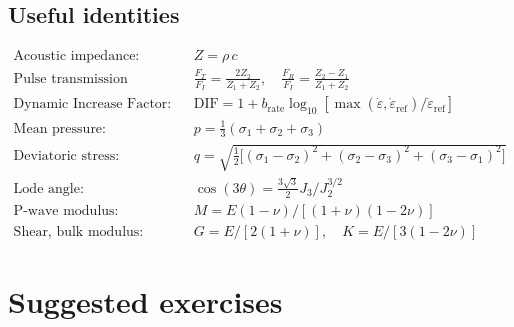 \documentclass[11pt,a4paper,openany]{book}
\theoremstyle{handbook}
\newcommand{\sig}{\sigma}
\newcommand{\eps}{\varepsilon}
\newcommand{\epsdot}{\dot\eps}
\begin{document}
\section{Useful identities}
\begin{align*}
  \text{Acoustic impedance:}\quad & Z=\rho\,c \\
  \text{Pulse transmission (Fresnel):}\quad
    & \frac{F_T}{F_I}=\frac{2Z_2}{Z_1+Z_2},
      \quad \frac{F_R}{F_I}=\frac{Z_2-Z_1}{Z_1+Z_2} \\
  \text{Dynamic Increase Factor:}\quad
    & \text{DIF}=1+b_{\text{rate}}\log_{10}
      \!\left[\max(\epsdot,\epsdot_{\text{ref}})/\epsdot_{\text{ref}}\right] \\
  \text{Mean pressure:}\quad & p=\tfrac{1}{3}(\sig_1+\sig_2+\sig_3) \\
  \text{Deviatoric stress:}\quad
    & q=\sqrt{\tfrac{1}{2}\bigl[(\sig_1-\sig_2)^{2}+(\sig_2-\sig_3)^{2}+(\sig_3-\sig_1)^{2}\bigr]} \\
  \text{Lode angle:}\quad
    & \cos(3\theta)=\tfrac{3\sqrt{3}}{2}J_3/J_2^{3/2} \\
  \text{P-wave modulus:}\quad
    & M=E(1-\nu)/[(1+\nu)(1-2\nu)] \\
  \text{Shear, bulk modulus:}\quad
    & G=E/[2(1+\nu)],\quad K=E/[3(1-2\nu)]
\end{align*}

\chapter{Suggested exercises}\label{app:exercises}
\end{document}
